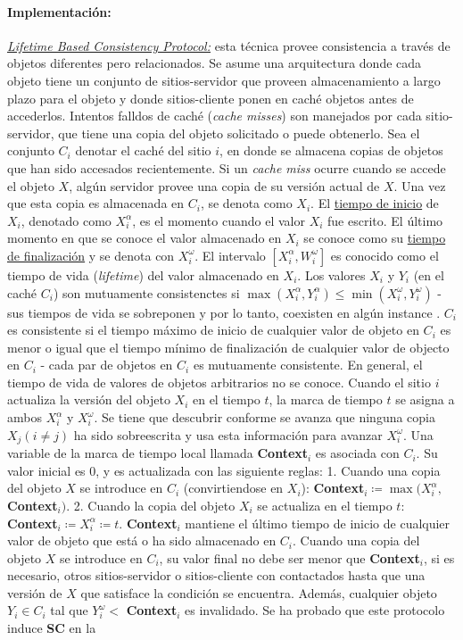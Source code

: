 \paragraph{\textnormal{\textbf{Implementación:}}}
\underline{\emph{Lifetime Based Consistency Protocol:}} esta técnica provee consistencia a través de objetos diferentes pero relacionados. Se asume una arquitectura donde cada objeto tiene un conjunto de sitios-servidor que proveen almacenamiento a largo plazo para el objeto y donde sitios-cliente ponen en caché objetos antes de accederlos. Intentos falldos de caché (\emph{cache misses}) son manejados por cada sitio-servidor, que tiene una copia del objeto solicitado o puede obtenerlo. Sea el conjunto $C_i$ denotar el caché del sitio $i$, en donde se almacena copias de objetos que han sido accesados recientemente. Si un \emph{cache miss} ocurre cuando se accede el objeto $X$, algún servidor provee una copia de su versión actual de $X$. Una vez que esta copia es almacenada en $C_i$, se denota como $X_i$. El \underline{tiempo de inicio} de $X_i$, denotado como $X_{i}^{\alpha}$, es el momento cuando el valor $X_i$ fue escrito. El último momento en que se conoce el valor almacenado en $X_i$ se conoce como su \underline{tiempo de finalización} y se denota con $X_{i}^{\omega}$. El intervalo $[X_{i}^{\alpha}, W_{i}^{\omega}]$ es conocido como el tiempo de vida (\emph{lifetime}) del valor almacenado en $X_i$. Los valores $X_i$ y $Y_i$ (en el caché $C_i$) son mutuamente consistenctes si $\max(X_{i}^{\alpha}, Y_{i}^{\alpha}) \leq \min(X_{i}^{\omega}, Y_{i}^{\omega})$ - sus tiempos de vida se sobreponen y por lo tanto, coexisten en algún instance . $C_i$ es consistente si el tiempo máximo de inicio de cualquier valor de objeto en $C_i$ es menor o igual que el tiempo mínimo de finalización de cualquier valor de objecto en $C_i$ - cada par de objetos en $C_i$ es mutuamente consistente. En general, el tiempo de vida de valores de objetos arbitrarios no se conoce. Cuando el sitio $i$ actualiza la versión del objeto $X_i$ en el tiempo $t$, la marca de tiempo $t$ se asigna a ambos $X_{i}^{\alpha}$ y $X_{i}^{\omega}$. Se tiene que descubrir conforme se avanza que ninguna copia $X_j (i \neq j)$ ha sido sobreescrita y usa esta información para avanzar $X_{i}^{\omega}$. Una variable de la marca de tiempo local llamada \textbf{Context}$_i$ es asociada con $C_i$. Su valor inicial es 0, y es actualizada con las siguiente reglas: 1. Cuando una copia del objeto $X$ se introduce en $C_i$ (convirtiendose en $X_i$): \textbf{Context}$_i \coloneqq \max(X_{i}^{\alpha},$ \textbf{Context}$_i)$. 2. Cuando la copia del objeto $X_i$ se actualiza en el tiempo $t$: \textbf{Context}$_i \coloneqq X_{i}^{\alpha} \coloneqq t$. \textbf{Context}$_i$ mantiene el último tiempo de inicio de cualquier valor de objeto que está o ha sido almacenado en $C_i$. Cuando una copia del objeto $X$ se introduce en $C_i$, su valor final no debe ser menor que \textbf{Context}$_i$, si es necesario, otros sitios-servidor o sitios-cliente con contactados hasta que una versión de $X$ que satisface la condición se encuentra. Además, cualquier objeto $Y_i \in C_i$ tal que $Y_{i}^{\omega} <$ \textbf{Context}$_i$ es invalidado. Se ha probado que este protocolo induce \textbf{SC} en la 